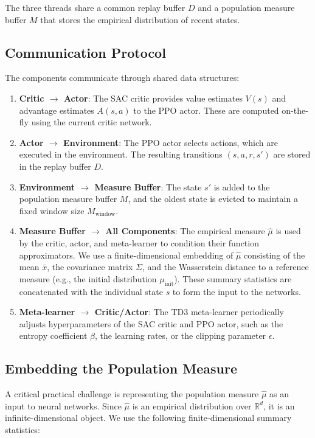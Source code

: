 The three threads share a common replay buffer $D$ and a population measure buffer
$M$ that stores the empirical distribution of recent states.

\subsection{Communication Protocol}

The components communicate through shared data structures:

\begin{enumerate}
    \item \textbf{Critic $\to$ Actor}: The SAC critic provides value estimates
    $V(s)$ and advantage estimates $A(s,a)$ to the PPO actor. These are computed
    on-the-fly using the current critic network.
    \item \textbf{Actor $\to$ Environment}: The PPO actor selects actions, which
    are executed in the environment. The resulting transitions $(s,a,r,s')$ are
    stored in the replay buffer $D$.
    \item \textbf{Environment $\to$ Measure Buffer}: The state $s'$ is added to
    the population measure buffer $M$, and the oldest state is evicted to maintain a
    fixed window size $M_{\mathrm{window}}$.
    \item \textbf{Measure Buffer $\to$ All Components}: The empirical measure
    $\hat\mu$ is used by the critic, actor, and meta-learner to condition their
    function approximators. We use a finite-dimensional embedding of $\hat\mu$
    consisting of the mean $\bar{x}$, the covariance matrix $\Sigma$, and the
    Wasserstein distance to a reference measure (e.g., the initial distribution
    $\mu_{\mathrm{init}}$). These summary statistics are concatenated with the
    individual state $s$ to form the input to the networks.
    \item \textbf{Meta-learner $\to$ Critic/Actor}: The TD3 meta-learner
    periodically adjusts hyperparameters of the SAC critic and PPO actor, such as
    the entropy coefficient $\beta$, the learning rates, or the clipping parameter
    $\epsilon$.
\end{enumerate}

\subsection{Embedding the Population Measure}

A critical practical challenge is representing the population measure $\hat\mu$ as
an input to neural networks. Since $\hat\mu$ is an empirical distribution over
$\mathbb{R}^d$, it is an infinite-dimensional object. We use the following
finite-dimensional summary statistics:

